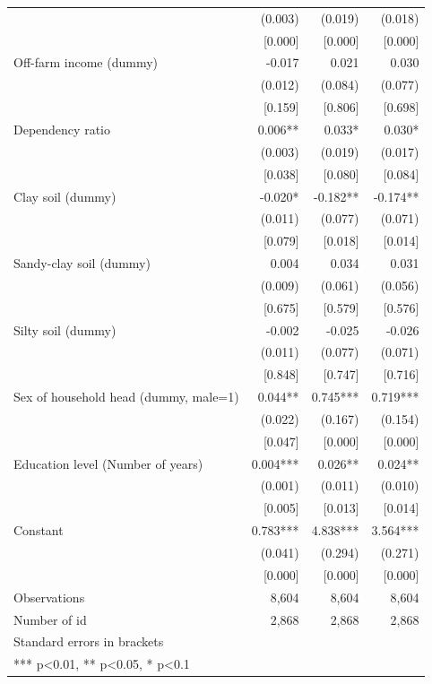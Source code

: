 \documentclass[
]{article}
\begin{document}
\begin{ThreePartTable}
\begin{longtable}[t]{lrrr}
 & (0.003) & (0.019) & (0.018)\\
 & {}[0.000] & {}[0.000] & {}[0.000]\\
Off-farm income (dummy) & -0.017 & 0.021 & 0.030\\
 & (0.012) & (0.084) & (0.077)\\
 & {}[0.159] & {}[0.806] & {}[0.698]\\
Dependency ratio & 0.006** & 0.033* & 0.030*\\
 & (0.003) & (0.019) & (0.017)\\
 & {}[0.038] & {}[0.080] & {}[0.084]\\
Clay soil (dummy) & -0.020* & -0.182** & -0.174**\\
 & (0.011) & (0.077) & (0.071)\\
 & {}[0.079] & {}[0.018] & {}[0.014]\\
Sandy-clay soil (dummy) & 0.004 & 0.034 & 0.031\\
 & (0.009) & (0.061) & (0.056)\\
 & {}[0.675] & {}[0.579] & {}[0.576]\\
Silty soil (dummy) & -0.002 & -0.025 & -0.026\\
 & (0.011) & (0.077) & (0.071)\\
 & {}[0.848] & {}[0.747] & {}[0.716]\\
Sex of household head (dummy, male=1) & 0.044** & 0.745*** & 0.719***\\
 & (0.022) & (0.167) & (0.154)\\
 & {}[0.047] & {}[0.000] & {}[0.000]\\
Education level (Number of years) & 0.004*** & 0.026** & 0.024**\\
 & (0.001) & (0.011) & (0.010)\\
 & {}[0.005] & {}[0.013] & {}[0.014]\\
Constant & 0.783*** & 4.838*** & 3.564***\\
 & (0.041) & (0.294) & (0.271)\\
 & {}[0.000] & {}[0.000] & {}[0.000]\\
Observations & 8,604 & 8,604 & 8,604\\
Number of id & 2,868 & 2,868 & 2,868\\
Standard errors in brackets &  &  & \\
*** p<0.01, ** p<0.05, * p<0.1 &  &  & \\*
\end{longtable}
\end{ThreePartTable}
\endgroup{}
\newpage
\end{document}

